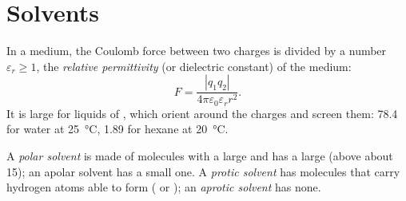 \section{Solvents}

\begin{definition}\label{def:b1:intermolecular-forces-solvents:permittivity}
In a medium, the Coulomb force between two charges is divided by a number
$\varepsilon_r \ge 1$, the \emph{relative permittivity} (or dielectric constant) of the medium:
\[
  F = \frac{|q_1 q_2|}{4\pi\varepsilon_0\varepsilon_r r^2} .
\]
It is large for liquids of , which orient around the
charges and screen them: \num{78.4} for water at \qty{25}{\celsius},
\num{1.89} for hexane at \qty{20}{\celsius}.
\end{definition}

\begin{definition}\label{def:b1:intermolecular-forces-solvents:solvent-classes}
A \emph{polar solvent} is made of molecules with a
large  and has a large  (above about
15); an apolar solvent has a small one. A \emph{protic
solvent} has molecules that carry hydrogen atoms
able to form  ( or ); an \emph{aprotic
solvent} has none.
\end{definition}


